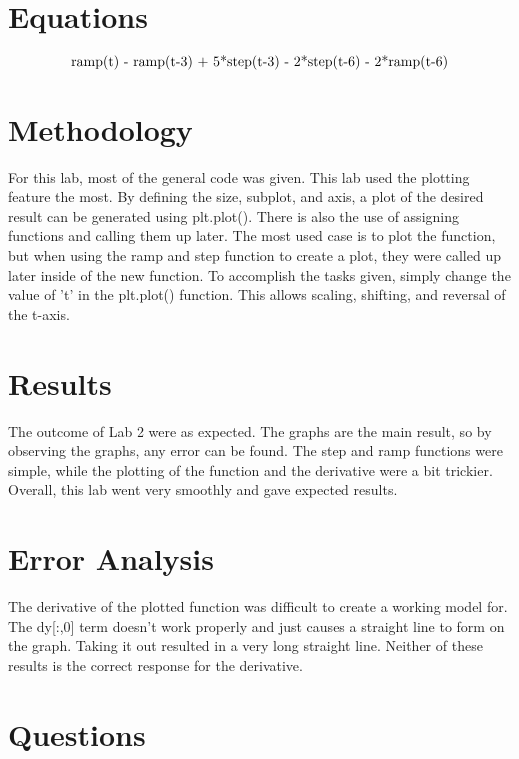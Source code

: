 \documentclass[12pt]{report}
\begin{document}
\section{Equations}

\begin{equation}
	$ramp(t) - ramp(t-3) + 5*step(t-3) - 2*step(t-6) - 2*ramp(t-6)$
\end{equation}
	
\section{Methodology}

For this lab, most of the general code was given. This lab used the plotting feature the most. By defining the size, subplot, and axis, a plot of the desired result can be generated using plt.plot(). There is also the use of assigning functions and calling them up later. The most used case is to plot the function, but when using the ramp and step function to create a plot, they were called up later inside of the new function. To accomplish the tasks given, simply change the value of 't' in the plt.plot() function. This allows scaling, shifting, and reversal of the t-axis.


\section{Results}

The outcome of Lab 2 were as expected. The graphs are the main result, so by observing the graphs, any error can be found. The step and ramp functions were simple, while the plotting of the function and the derivative were a bit trickier. Overall, this lab went very smoothly and gave expected results.

\section{Error Analysis}

The derivative of the plotted function was difficult to create a working model for. The dy[:,0] term doesn't work properly and just causes a straight line to form on the graph. Taking it out resulted in a very long straight line. Neither of these results is the correct response for the derivative. 

\section{Questions}
\end{document}
